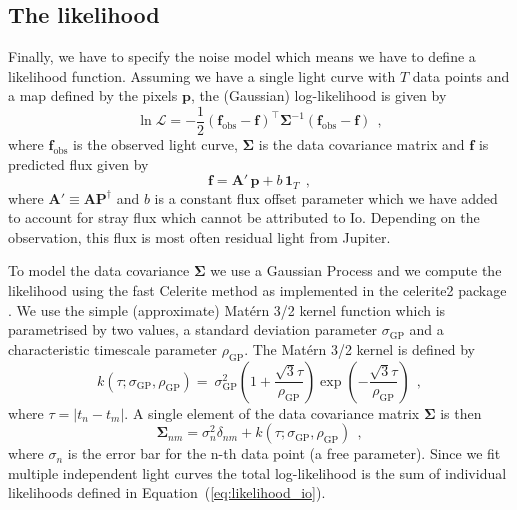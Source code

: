 \documentclass[12pt,dvipsnames]{report}
\newcommand{\hquad}{~~}
\begin{document}
\subsection{The likelihood}
\label{ssec:likelihood}
Finally, we have to specify the noise model which means we have to define a likelihood function.
Assuming we have a single light curve with $T$ data points and a map defined by the pixels $\mathbf{p}$, the (Gaussian) log-likelihood is given by
\begin{equation}
    \ln\mathcal{L}=-\frac{1}{2}\left(\mathbf{f}_\mathrm{obs}-\mathbf{f} \right)^{\top}
    \boldsymbol{\Sigma}^{-1}\left(\mathbf{f}_\mathrm{obs}-\mathbf{f} \right)
    \hquad,
    \label{eq:likelihood_io}
\end{equation}
where $\mathbf{f}_\mathrm{obs}$ is the observed light curve, $\boldsymbol{\Sigma}$ is the data covariance matrix and $\mathbf{f}$ is predicted flux given by
\begin{equation}
    \mathbf{f}=\mathbf{A}'\,\mathbf{p} +b\,\mathbf{1}_T
    \hquad,
    \label{eq:flux_model_io}
\end{equation}
where $\mathbf{A}'\equiv\mathbf{A}\mathbf{P}^\dagger$ and $b$ is a constant flux offset 
parameter which we have added to account for stray flux which cannot be attributed to Io.
Depending on the observation, this flux is most often residual light from Jupiter.

To model the data covariance $\boldsymbol{\Sigma}$ we use a Gaussian Process and we 
compute the likelihood using the fast Celerite method \citep{2017AJ....154..220F} as 
implemented in the \textsf{celerite2} package 
\citep{2017AJ....154..220F,2018RNAAS...2...31F}.
We use the simple (approximate) Mat\'ern 3/2 kernel function which is parametrised 
by two values, a standard deviation parameter $\sigma_\mathrm{GP}$ and a characteristic 
timescale parameter $\rho_\mathrm{GP}$.
The Mat\'ern 3/2 kernel is defined by
\begin{equation}
    k(\tau;\sigma_\mathrm{GP},
    \rho_\mathrm{GP})=\
    \sigma_\mathrm{GP}^{2}\left(1+\frac{\sqrt{3} \tau}{\rho_\mathrm{GP}}\right) \exp \left(-\frac{\sqrt{3} \tau}{\rho_\mathrm{GP}}\right)
    \hquad,
\end{equation}
where $\tau=|t_n-t_m|$.
A single element of the data covariance matrix $\boldsymbol{\Sigma}$ is then 
\begin{equation}
    \boldsymbol{\Sigma}_{nm}=\sigma_n^2\delta_{nm} + k(\tau;\sigma_\mathrm{GP},\rho_\mathrm{GP})
    \hquad,
    \label{eq:data_covariance_element}
\end{equation}
where $\sigma_n$ is the error bar for the n-th data point (a free parameter).
Since we fit multiple independent light curves the total log-likelihood is the sum of 
individual likelihoods defined in Equation~(\ref{eq:likelihood_io}).
\end{document}
